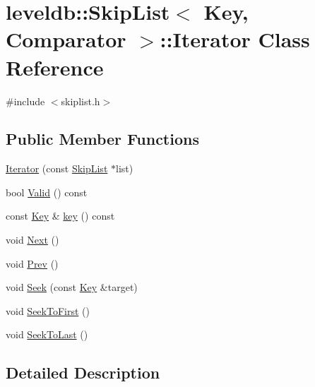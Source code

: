 \hypertarget{classleveldb_1_1_skip_list_1_1_iterator}{}\section{leveldb\+:\+:Skip\+List$<$ Key, Comparator $>$\+:\+:Iterator Class Reference}
\label{classleveldb_1_1_skip_list_1_1_iterator}


{\ttfamily \#include $<$skiplist.\+h$>$}

\subsection*{Public Member Functions}
\begin{DoxyCompactItemize}
\item 
\hyperlink{classleveldb_1_1_skip_list_1_1_iterator_ab27d6dd0959d67ed26f2bd451c18270c}{Iterator} (const \hyperlink{classleveldb_1_1_skip_list}{Skip\+List} $\ast$list)
\item 
bool \hyperlink{classleveldb_1_1_skip_list_1_1_iterator_ac074827b7e9ded32283385e6228ef8cd}{Valid} () const 
\item 
const \hyperlink{namespaceleveldb_a7e9a9725b13fa0bd922d885280dfab95}{Key} \& \hyperlink{classleveldb_1_1_skip_list_1_1_iterator_a5d2a82038f440d557b32afb398c7eb57}{key} () const 
\item 
void \hyperlink{classleveldb_1_1_skip_list_1_1_iterator_ade5a684c74056f578f85237735da0cef}{Next} ()
\item 
void \hyperlink{classleveldb_1_1_skip_list_1_1_iterator_a10dbaf45640ab2b9f61a96c82e7227e5}{Prev} ()
\item 
void \hyperlink{classleveldb_1_1_skip_list_1_1_iterator_a6c641d5cd37386abdb0aa8d73454611a}{Seek} (const \hyperlink{namespaceleveldb_a7e9a9725b13fa0bd922d885280dfab95}{Key} \&target)
\item 
void \hyperlink{classleveldb_1_1_skip_list_1_1_iterator_adf69c04f0480a66f10a125c49e19caa7}{Seek\+To\+First} ()
\item 
void \hyperlink{classleveldb_1_1_skip_list_1_1_iterator_afe892ff436137b85216c2ed124f3c6dd}{Seek\+To\+Last} ()
\end{DoxyCompactItemize}


\subsection{Detailed Description}
